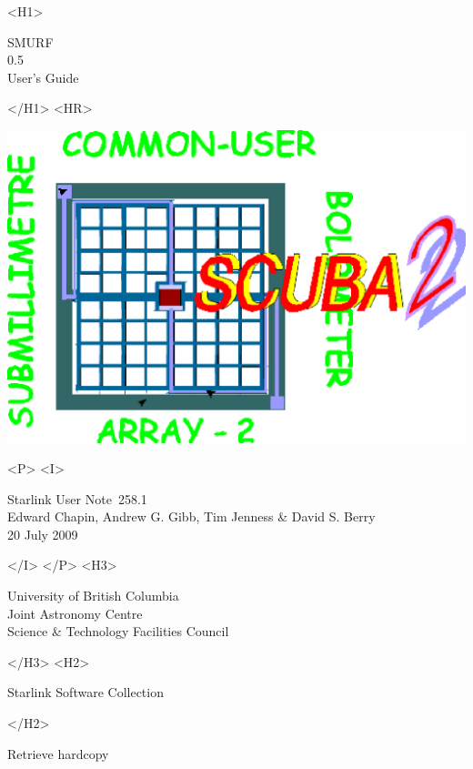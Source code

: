 \documentclass[twoside,11pt]{article}
\newcommand{\stardoccategory}  {Starlink User Note}
\newcommand{\stardocsource}    {sun\stardocnumber}
\newcommand{\stardocnumber}    {258.1}
\newcommand{\stardocauthors}   {Edward Chapin, Andrew G. Gibb, Tim Jenness \& David S. Berry}
\newcommand{\stardocdate}      {20 July 2009}
\newcommand{\stardoctitle}     {SMURF}
\newcommand{\stardocversion}   {0.5}
\newcommand{\stardocmanual}    {User's Guide}
\newcommand{\htmladdnormallink}[2]{#1}
\newcommand{\htmladdimg}[1]{}
\newcommand{\xlabel}[1]{}
\renewcommand{\_}{\texttt{\symbol{95}}}
\begin{document}
\begin{htmlonly}
   \xlabel{}
   \begin{rawhtml} <H1> \end{rawhtml}
      \stardoctitle\\
      \stardocversion\\
      \stardocmanual
   \begin{rawhtml} </H1> <HR> \end{rawhtml}

\includegraphics[scale=0.7]{sun258_logo.eps}

   \begin{rawhtml} <P> <I> \end{rawhtml}
   \stardoccategory\ \stardocnumber \\
   \stardocauthors \\
   \stardocdate
   \begin{rawhtml} </I> </P> <H3> \end{rawhtml}
      \htmladdnormallink{University of British Columbia}
                        {http://www.ubc.ca} \\
      \htmladdnormallink{Joint Astronomy Centre}
                        {http://www.jach.hawaii.edu}\\
      \htmladdnormallink{Science \& Technology Facilities Council}
                        {http://www.pparc.ac.uk} \\
   \begin{rawhtml} </H3> <H2> \end{rawhtml}
      \htmladdnormallink{Starlink Software Collection}{http://starlink.jach.hawaii.edu/}
   \begin{rawhtml} </H2> \end{rawhtml}
   \htmladdnormallink{\htmladdimg{source.gif} Retrieve hardcopy}
      {http://starlink.jach.hawaii.edu/cgi-bin/hcserver?\stardocsource}\\


\end{htmlonly}
\end{document}
